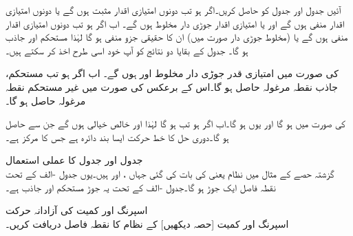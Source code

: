 آئیں جدول  اور جدول  کو حاصل کریں۔اگر  ہو تب دونوں امتیازی اقدار مثبت ہوں گے یا دونوں امتیازی اقدار منفی ہوں گے اور یا امتیازی اقدار جوڑی دار مخلوط ہوں گے۔ اب اگر  ہو تب دونوں امتیازی اقدار  منفی ہوں گے یا (مخلوط جوڑی دار صورت میں) ان کا حقیقی جزو منفی ہو گا لہٰذا  مستحکم اور جاذب ہو گا۔ جدول  کے بقایا دو نتائج کو آپ خود اسی طرح اخذ کر سکتے ہیں۔

  کی صورت میں امتیازی قدر جوڑی دار مخلوط  اور  ہوں گے۔ اب اگر  ہو تب مستحکم، جاذب نقطہ مرغولہ حاصل ہو گا۔اس کے برعکس  کی صورت میں غیر مستحکم نقطہ مرغولہ حاصل ہو گا۔

 کی صورت میں  ہو گا اور یوں  ہو گا۔اب اگر  ہو تب   ہو گا لہٰذا  اور  خالص خیالی ہوں گے جن سے   حاصل ہو گا۔دوری حل کا خط حرکت ایسا بند دائرہ ہے جس کا مرکز  ہے۔

\quad جدول  اور جدول  کا عملی استعمال\\
گزشتہ حصے کے مثال  میں نظام  یعنی 
  کی بات کی گئی جہاں ،  اور  ہیں۔یوں جدول -الف کے تحت نقطہ فاصل ایک جوڑ ہو گا۔جدول -الف کے تحت یہ جوڑ مستحکم اور جاذب ہے۔

\quad اسپرنگ اور کمیت کی آزادانہ حرکت\\
اسپرنگ اور کمیت [حصہ  دیکھیں] کے نظام  کا نقطہ فاصل دریافت کریں۔

